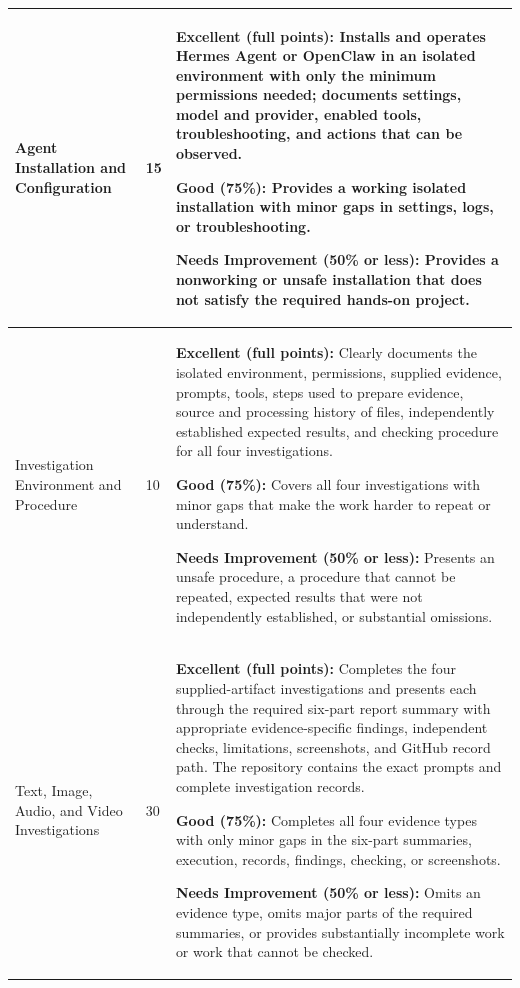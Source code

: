 \documentclass[12pt,letterpaper]{article}
\begin{document}
\begin{longtable}{|p{}|p{}|p{}|}
    \hline
    Agent Installation and Configuration         & 15              & \textbf{Excellent (full points):} Installs and operates Hermes Agent or OpenClaw in an isolated environment with only the minimum permissions needed; documents settings, model and provider, enabled tools, troubleshooting, and actions that can be observed. \par\medskip \textbf{Good (75\%):} Provides a working isolated installation with minor gaps in settings, logs, or troubleshooting. \par\medskip \textbf{Needs Improvement (50\% or less):} Provides a nonworking or unsafe installation that does not satisfy the required hands-on project.                                                                                                                                                                                              \\
    \hline
    Investigation Environment and Procedure      & 10              & \textbf{Excellent (full points):} Clearly documents the isolated environment, permissions, supplied evidence, prompts, tools, steps used to prepare evidence, source and processing history of files, independently established expected results, and checking procedure for all four investigations. \par\medskip \textbf{Good (75\%):} Covers all four investigations with minor gaps that make the work harder to repeat or understand. \par\medskip \textbf{Needs Improvement (50\% or less):} Presents an unsafe procedure, a procedure that cannot be repeated, expected results that were not independently established, or substantial omissions.                                                                                                 \\
    \hline
    Text, Image, Audio, and Video Investigations & 30              & \textbf{Excellent (full points):} Completes the four supplied-artifact investigations and presents each through the required six-part report summary with appropriate evidence-specific findings, independent checks, limitations, screenshots, and GitHub record path. The repository contains the exact prompts and complete investigation records. \par\medskip \textbf{Good (75\%):} Completes all four evidence types with only minor gaps in the six-part summaries, execution, records, findings, checking, or screenshots. \par\medskip \textbf{Needs Improvement (50\% or less):} Omits an evidence type, omits major parts of the required summaries, or provides substantially incomplete work or work that cannot be checked.                 \\

\end{longtable}
\end{document}
